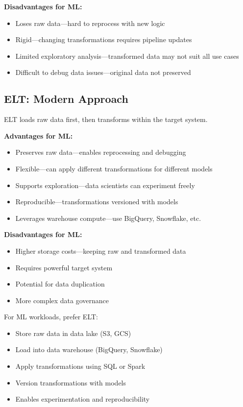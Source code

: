 \textbf{Disadvantages for ML:}
\begin{itemize}
    \item Loses raw data—hard to reprocess with new logic
    \item Rigid—changing transformations requires pipeline updates
    \item Limited exploratory analysis—transformed data may not suit all use cases
    \item Difficult to debug data issues—original data not preserved
\end{itemize}

\subsection{ELT: Modern Approach}

ELT loads raw data first, then transforms within the target system.

\textbf{Advantages for ML:}
\begin{itemize}
    \item Preserves raw data—enables reprocessing and debugging
    \item Flexible—can apply different transformations for different models
    \item Supports exploration—data scientists can experiment freely
    \item Reproducible—transformations versioned with models
    \item Leverages warehouse compute—use BigQuery, Snowflake, etc.
\end{itemize}

\textbf{Disadvantages for ML:}
\begin{itemize}
    \item Higher storage costs—keeping raw and transformed data
    \item Requires powerful target system
    \item Potential for data duplication
    \item More complex data governance
\end{itemize}

\begin{bestpractice}
For ML workloads, prefer ELT:
\begin{itemize}
    \item Store raw data in data lake (S3, GCS)
    \item Load into data warehouse (BigQuery, Snowflake)
    \item Apply transformations using SQL or Spark
    \item Version transformations with models
    \item Enables experimentation and reproducibility
\end{itemize}
\end{bestpractice}

